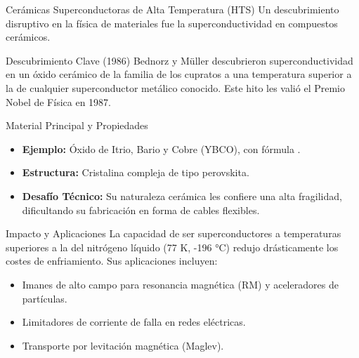 \begin{frame}{Cerámicas Superconductoras de Alta Temperatura (HTS)}
  Un descubrimiento disruptivo en la física de materiales fue la 
  superconductividad en compuestos cerámicos.

  \begin{block}{Descubrimiento Clave (1986)}
    Bednorz y Müller descubrieron superconductividad en un óxido cerámico de la 
    familia de los cupratos a una temperatura superior a la de cualquier 
    superconductor metálico conocido. Este hito les valió el Premio Nobel de 
    Física en 1987.
  \end{block}

  \begin{block}{Material Principal y Propiedades}
    \begin{itemize}
      \item \textbf{Ejemplo:} Óxido de Itrio, Bario y Cobre (YBCO), con fórmula 
        .
      \item \textbf{Estructura:} Cristalina compleja de tipo perovskita.
      \item \textbf{Desafío Técnico:} Su naturaleza cerámica les confiere una 
        alta fragilidad, dificultando su fabricación en forma de cables 
        flexibles.
    \end{itemize}
  \end{block}

  \begin{block}{Impacto y Aplicaciones}
    La capacidad de ser superconductores a temperaturas superiores a la del 
    nitrógeno líquido (77 K, -196 °C) redujo drásticamente los costes de 
    enfriamiento. Sus aplicaciones incluyen:
     \begin{itemize}
        \item Imanes de alto campo para resonancia magnética (RM) y 
          aceleradores de partículas.
        \item Limitadores de corriente de falla en redes eléctricas.
        \item Transporte por levitación magnética (Maglev).
     \end{itemize}
  \end{block}
\end{frame}

